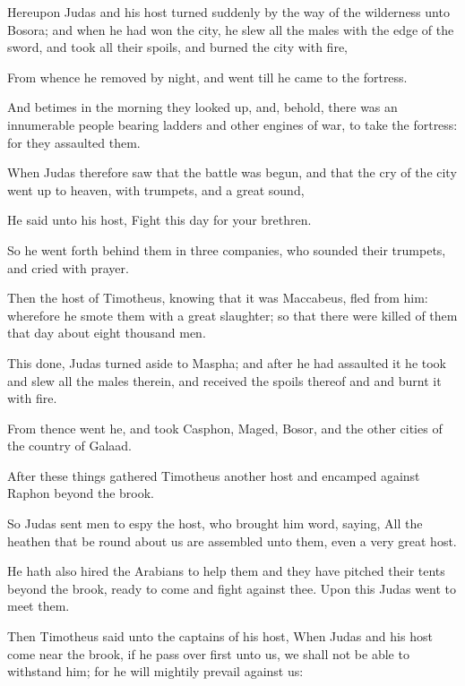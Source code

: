 {\par }{\PP {}Hereupon Judas and his host turned suddenly by the way of the wilderness unto Bosora; and when he had won the city, he slew all the males with the edge of the sword, and took all their spoils, and burned the city with fire,
\par }{\PP {}From whence he removed by night, and went till he came to the fortress.
\par }{\PP {}And betimes in the morning they looked up, and, behold, there was an innumerable people bearing ladders and other engines of war, to take the fortress: for they assaulted them.
\par }{\PP {}When Judas therefore saw that the battle was begun, and that the cry of the city went up to heaven, with trumpets, and a great sound,
\par }{\PP {}He said unto his host, Fight this day for your brethren.
\par }{\PP {}So he went forth behind them in three companies, who sounded their trumpets, and cried with prayer.
\par }{\PP {}Then the host of Timotheus, knowing that it was Maccabeus, fled from him: wherefore he smote them with a great slaughter; so that there were killed of them that day about eight thousand men.
\par }{\PP {}This done, Judas turned aside to Maspha; and after he had assaulted it he took and slew all the males therein, and received the spoils thereof and and burnt it with fire.
\par }{\PP {}From thence went he, and took Casphon, Maged, Bosor, and the other cities of the country of Galaad.
\par }{\PP {}After these things gathered Timotheus another host and encamped against Raphon beyond the brook.
\par }{\PP {}So Judas sent men to espy the host, who brought him word, saying, All the heathen that be round about us are assembled unto them, even a very great host.
\par }{\PP {}He hath also hired the Arabians to help them and they have pitched their tents beyond the brook, ready to come and fight against thee. Upon this Judas went to meet them.
\par }{\PP {}Then Timotheus said unto the captains of his host, When Judas and his host come near the brook, if he pass over first unto us, we shall not be able to withstand him; for he will mightily prevail against us:
}
